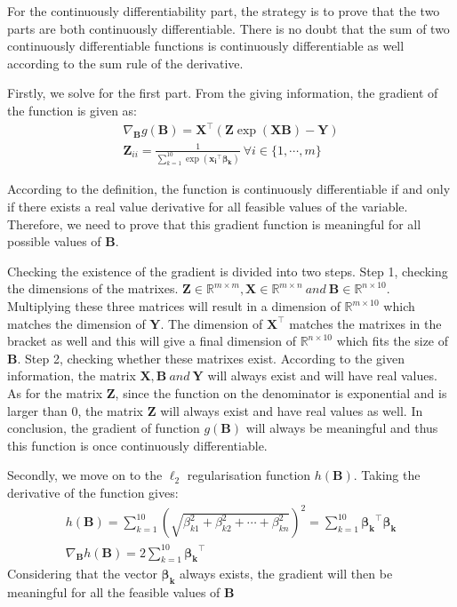 \documentclass[12pt]{article}
\numberwithin{equation}{section}
\theoremstyle{remark}
\newcommand{\R}{\mathbb R} %
\newcommand{\vect}[1]{\boldsymbol{#1}}
\begin{document}
\medskip
For the continuously differentiability part, the strategy is to prove that the two parts are both continuously differentiable. There is no doubt that the sum of two continuously differentiable functions is continuously differentiable as well according to the sum rule of the derivative.

\medskip
Firstly, we solve for the first part. From the giving information, the gradient of the function is given as:
\begin{gather}
\nabla_{\vect{B}} g(\vect{B}) = \vect{X}^{\top}(\vect{Z} \exp(\vect{X}\vect{B}) - \vect{Y}) \\
\vect{Z}_{ii} = \frac{1}{\sum\limits_{k = 1}^{10}\exp(\vect{x_i}^{\top}\vect{\beta_k})}\  \forall i \in \{1, \cdots, m\}
\end{gather}

According to the definition, the function is continuously differentiable if and only if there exists a real value derivative for all feasible values of the variable. Therefore, we need to prove that this gradient function is meaningful for all possible values of $\vect{B}$. 

\medskip
Checking the existence of the gradient is divided into two steps. Step 1, checking the dimensions of the matrixes. $\vect{Z} \in \R^{m \times m}, \vect{X} \in \R^{m \times n}\  and\  \vect{B} \in \R^{n \times 10}$. Multiplying these three matrices will result in a dimension of $\R^{m \times 10}$ which matches the dimension of $\vect{Y}$. The dimension of $\vect{X}^{\top}$ matches the matrixes in the bracket as well and this will give a final dimension of $\R^{n \times 10}$ which fits the size of $\vect{B}$. Step 2, checking whether these matrixes exist. According to the given information, the matrix $\vect{X}, \vect{B}\  and\  \vect{Y}$ will always exist and will have real values. As for the matrix $\vect{Z}$, since the function on the denominator is exponential and is larger than 0, the matrix $\vect{Z}$ will always exist and have real values as well. In conclusion, the gradient of function $g(\vect{B})$ will always be meaningful and thus this function is once continuously differentiable.

\medskip
Secondly, we move on to the $\ell_2$ regularisation function $h(\vect{B})$. Taking the derivative of the function gives:
\begin{gather}
h(\vect{B}) = \sum\limits_{k = 1}^{10}\left(\sqrt{\beta_{k1}^2 + \beta_{k2}^2 + \cdots + \beta_{kn}^2}\right)^2 = \sum\limits_{k = 1}^{10}\vect{\beta_k}^{\top}\vect{\beta_k} \\
\nabla_{\vect{B}} h(\vect{B}) = 2\sum\limits_{k = 1}^{10}\vect{\beta_k}^{\top}
\end{gather}
Considering that the vector $\vect{\beta_k}$ always exists, the gradient will then be meaningful for all the feasible values of $\vect{B}$
\end{document}
